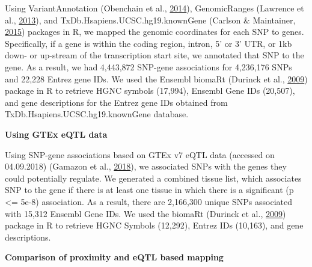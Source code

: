 \documentclass[12pt,twoside]{unicam}
\begin{document}
Using VariantAnnotation (Obenchain et al., \protect\hyperlink{ref-Obenchain2014}{2014}), GenomicRanges (Lawrence et al., \protect\hyperlink{ref-Lawrence2013}{2013}), and TxDb.Hsapiens.UCSC.hg19.knownGene (Carlson \& Maintainer, \protect\hyperlink{ref-Carlson2015}{2015}) packages in R, we mapped the genomic coordinates for each SNP to genes. Specifically, if a gene is within the coding region, intron, 5' or 3' UTR, or 1kb down- or up-stream of the transcription start site, we annotated that SNP to the gene. As a result, we had 4,443,872 SNP-gene associations for 4,236,176 SNPs and 22,228 Entrez gene IDs. We used the Ensembl biomaRt (Durinck et al., \protect\hyperlink{ref-Durinck2009}{2009}) package in R to retrieve HGNC symbols (17,994), Ensembl Gene IDs (20,507), and gene descriptions for the Entrez gene IDs obtained from TxDb.Hsapiens.UCSC.hg19.knownGene database.

\textbf{Using GTEx eQTL data}

Using SNP-gene associations based on GTEx v7 eQTL data (accessed on 04.09.2018) (Gamazon et al., \protect\hyperlink{ref-Gamazon2018}{2018}), we associated SNPs with the genes they could potentially regulate. We generated a combined tissue list, which associates SNP to the gene if there is at least one tissue in which there is a significant (p \textless= 5e-8) association. As a result, there are 2,166,300 unique SNPs associated with 15,312 Ensembl Gene IDs. We used the biomaRt (Durinck et al., \protect\hyperlink{ref-Durinck2009}{2009}) package in R to retrieve HGNC Symbols (12,292), Entrez IDs (10,163), and gene descriptions.

\textbf{Comparison of proximity and eQTL based mapping}
\end{document}
